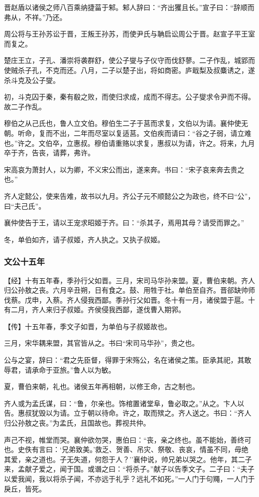 \documentclass[]{article}
\begin{document}
晋赵盾以诸侯之师八百乘纳捷菑于邾。邾人辞曰：``齐出玃且长。''宣子曰：``辞顺而弗从，不祥。''乃还。

周公将与王孙苏讼于晋，王叛王孙苏，而使尹氏与聃启讼周公于晋。赵宣子平王室而复之。

楚庄王立，子孔、潘崇将袭群舒，使公子燮与子仪守而伐舒蓼。二子作乱，城郢而使贼杀子孔，不克而还。八月，二子以楚子出，将如商密。庐戢梨及叔麋诱之，遂杀斗克及公子燮。

初，斗克囚于秦，秦有殽之败，而使归求成，成而不得志。公子燮求令尹而不得。故二子作乱。

穆伯之从己氏也，鲁人立文伯。穆伯生二子于莒而求复，文伯以为请。襄仲使无朝。听命，复而不出，二年而尽室以复适莒。文伯疾而请曰：``谷之子弱，请立难也。''许之。文伯卒，立惠叔。穆伯请重赂以求复，惠叔以为请，许之。将来，九月卒于齐，告丧，请葬，弗许。

宋高哀为萧封人，以为卿，不义宋公而出，遂来奔。书曰：``宋子哀来奔去贵之也。''

齐人定懿公，使来告难，故书以九月。齐公子元不顺懿公之为政也，终不曰``公''，曰``夫己氏''。

襄仲使告于王，请以王宠求昭姬于齐。曰：``杀其子，焉用其母？请受而罪之。''

冬，单伯如齐，请子叔姬，齐人执之。又执子叔姬。

\hypertarget{header-n1229}{%
\subsubsection{文公十五年}\label{header-n1229}}

【经】十有五年春，季孙行父如晋。三月，宋司马华孙来盟。夏，曹伯来朝。齐人归公孙敖之丧。六月辛丑朔，日有食之。鼓、用牲于社。单伯至自齐。晋郤缺帅师伐蔡。戊申，入蔡。齐人侵我西鄙。季孙行父如晋。冬十有一月，诸侯盟于扈。十有二月，齐人来归子叔姬。齐侯侵我西鄙，遂伐曹入期郛。

【传】十五年春，季文子如晋，为单伯与子叔姬故也。

三月，宋华耦来盟，其官皆从之。书曰``宋司马华孙''，贵之也。

公与之宴，辞曰：``君之先臣督，得罪于宋殇公，名在诸侯之策。臣承其祀，其敢辱君，请承命于亚旅。''鲁人以为敏。

夏，曹伯来朝，礼也。诸侯五年再相朝，以修王命，古之制也。

齐人或为孟氏谋，曰：``鲁，尔亲也。饰棺置诸堂阜，鲁必取之。''从之。卞人以告。惠叔犹毁以为请。立于朝以待命。许之，取而殡之。齐人送之。书曰：``齐人归公孙敖之丧。''为孟氏，且国故也。葬视共仲。

声己不视，帷堂而哭。襄仲欲勿哭，惠伯曰：``丧，亲之终也。虽不能始，善终可也。史佚有言曰：`兄弟致美。'救乏、贺善、吊灾、祭敬、丧哀，情虽不同，毋绝其爱，亲之道也。子无失道，何怨于人？''襄仲说，帅兄弟以哭之。他年，其二子来，孟献子爱之，闻于国。或谮之曰：``将杀子。''献子以告季文子。二子曰：``夫子以爱我闻，我以将杀子闻，不亦远于礼乎？远礼不如死。''一人门于句鼆，一人门于戾丘，皆死。
\end{document}
